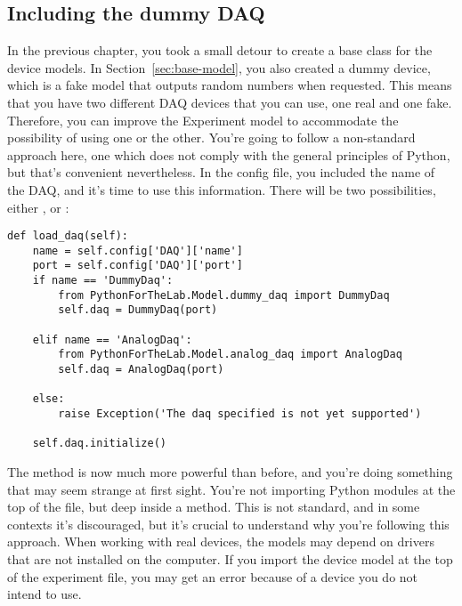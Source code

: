 
\subsection{Including the dummy DAQ}\label{subsec:loading-dummy-daq}
In the previous chapter, you took a small detour to create a base class for the device models. In Section~\ref{sec:base-model}, you also created a dummy device, which is a fake model that outputs random numbers when requested. This means that you have two different DAQ devices that you can use, one real and one fake. Therefore, you can improve the Experiment model to accommodate the possibility of using one or the other. You're going to follow a non-standard approach here, one which does not comply with the general principles of Python, but that's convenient nevertheless. In the config file, you included the name of the DAQ, and it's time to use this information. There will be two possibilities, either , or :

\begin{verbatim}
def load_daq(self):
    name = self.config['DAQ']['name']
    port = self.config['DAQ']['port']
    if name == 'DummyDaq':
        from PythonForTheLab.Model.dummy_daq import DummyDaq
        self.daq = DummyDaq(port)

    elif name == 'AnalogDaq':
        from PythonForTheLab.Model.analog_daq import AnalogDaq
        self.daq = AnalogDaq(port)

    else:
        raise Exception('The daq specified is not yet supported')

    self.daq.initialize()
\end{verbatim}

The  method is now much more powerful than before, and you're doing something that may seem strange at first sight. You're not importing Python modules at the top of the file, but deep inside a method. This is not standard, and in some contexts it's discouraged, but it's crucial to understand why you're following this approach. When working with real devices, the models may depend on drivers that are not installed on the computer. If you import the device model at the top of the experiment file, you may get an error because of a device you do not intend to use.

